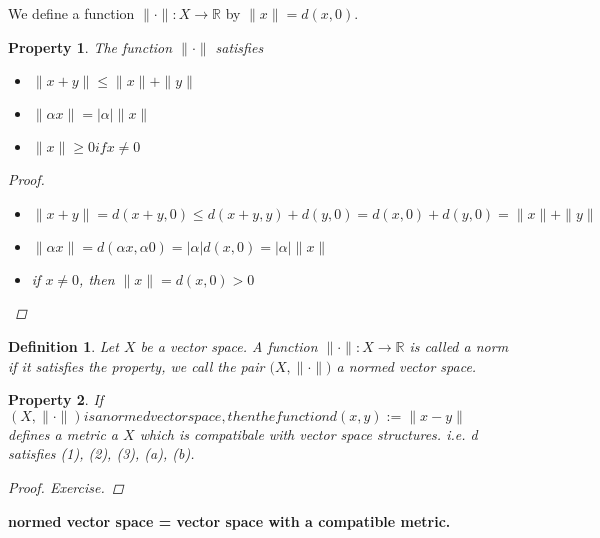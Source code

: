\documentclass{article}
\newtheorem*{property}{Property}
\newtheorem*{definition}{Definition}
\begin{document}
We define a function $\|\cdot\|:X \rightarrow \mathbb{R}$ by $\|x\|=d(x, 0)$.
\begin{property}
    The function $\|\cdot\|$ satisfies
    \begin{itemize}
        \item $\|x + y\| \le \|x\| + \|y\|$
        \item $\|\alpha x\| = |\alpha|\|x\|$
        \item $\|x\| \ge 0 if x \ne 0$
    \end{itemize}
    \begin{proof}
        \begin{itemize}
            \item $\|x + y\|=d(x+y, 0) \le d(x+y, y) + d(y, 0) = d(x, 0) + d(y, 0) = \|x\| + \|y\|$
            \item $\|\alpha x\| = d(\alpha x, \alpha 0) = |\alpha|d(x, 0) = |\alpha|\|x\|$
            \item if $x \ne 0$, then $\|x\|=d(x, 0) > 0$
        \end{itemize}
    \end{proof}
\end{property}
\begin{definition}
    Let $X$ be a vector space. A function $\|\cdot\|: X \rightarrow \mathbb{R}$ is called a norm
    if it satisfies the property, we call the pair $\bigl(X, \|\cdot\|\bigr)$ a normed vector space.
\end{definition}
\begin{property}
If $(X, \|\cdot\|) is a normed vector space, then the function d(x, y):=\|x-y\|$
defines a metric a $X$ which is compatibale with vector space structures.
i.e. d satisfies (1), (2), (3), (a), (b).
\begin{proof}
    Exercise.
\end{proof}
\end{property}
\textbf{normed vector space = vector space with a compatible metric.}
\end{document}
